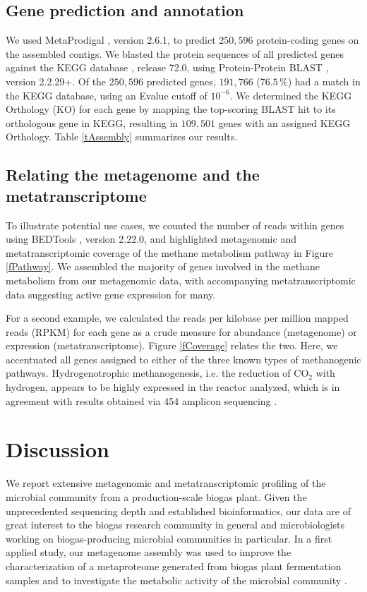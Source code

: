\documentclass{bmcart}
\begin{document}
\subsection*{Gene prediction and annotation}
We used MetaProdigal \cite{MetaProdigal}, version 2.6.1, to predict $250,596$ protein-coding genes on the assembled contigs.
We blasted the protein sequences of all predicted genes against the KEGG database \cite{KeggDB}, release 72.0, using Protein-Protein BLAST \cite{BlastPlus}, version 2.2.29+. 
Of the $250,596$ predicted genes, $191,766$ ($76.5\,\%$) had a match in the KEGG database, using an Evalue cutoff of $10^{-6}$.
We determined the KEGG Orthology (KO) for each gene by mapping the top-scoring BLAST hit to its orthologous gene in KEGG, resulting in $109,501$ genes with an assigned KEGG Orthology.
Table \ref{tAssembly} summarizes our results.

\subsection*{Relating the metagenome and the metatranscriptome}
To illustrate potential use cases, we counted the number of reads within genes using BEDTools \cite{BEDTools}, version 2.22.0, and highlighted metagenomic and metatranscriptomic coverage of the methane metabolism pathway in Figure \ref{fPathway}.
We assembled the majority of genes involved in the methane metabolism from our metagenomic data, with accompanying metatranscriptomic data suggesting active gene expression for many.

For a second example, we calculated the reads per kilobase per million mapped reads (RPKM) for each gene as a crude measure for abundance (metagenome) or expression (metatranscriptome).
Figure \ref{fCoverage} relates the two. Here, we accentuated all genes assigned to either of the three known types of methanogenic pathways.
Hydrogenotrophic methanogenesis, i.e. the reduction of CO$_{\text{2}}$ with hydrogen, appears to be highly expressed in the reactor analyzed, which is in agreement with results obtained via 454 amplicon sequencing \cite{Zakrzewski2012}.

\section*{Discussion}

We report extensive metagenomic and metatranscriptomic profiling of the microbial community from a production-scale biogas plant.
Given the unprecedented sequencing depth and established bioinformatics, our data are of great interest to the biogas research community in general and microbiologists working on biogas-producing microbial communities in particular.
In a first applied study, our metagenome assembly was used to improve the characterization of a metaproteome generated from biogas plant fermentation samples and to investigate the metabolic activity of the microbial community \cite{Kohrs2015}.
\end{document}
